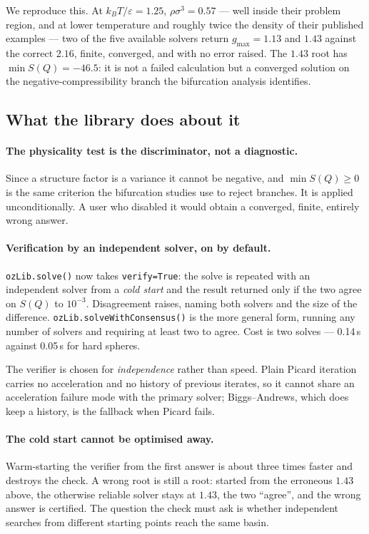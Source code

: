 \documentclass[11pt,a4paper]{article}
\newcommand{\code}[1]{\texttt{\hspace{0pt}#1}}
\begin{document}
We reproduce this. At $k_BT/\varepsilon = 1.25$, $\rho\sigma^3 = 0.57$ ---
well inside their problem region, and at lower temperature and roughly twice
the density of their published examples --- two of the five available solvers
return $g_{\max} = 1.13$ and $1.43$ against the correct $2.16$, finite,
converged, and with no error raised. The $1.43$ root has
$\min S(Q) = -46.5$: it is not a failed calculation but a converged solution
on the negative-compressibility branch the bifurcation analysis identifies.

\subsection{What the library does about it}

\paragraph{The physicality test is the discriminator, not a diagnostic.}
Since a structure factor is a variance it cannot be negative, and
$\min S(Q) \ge 0$ is the same criterion the bifurcation studies use to reject
branches. It is applied unconditionally. A user who disabled it would obtain
a converged, finite, entirely wrong answer.

\paragraph{Verification by an independent solver, on by default.}
\code{ozLib.solve()} now takes \code{verify=True}: the solve is repeated with
an independent solver from a \emph{cold start} and the result returned only if
the two agree on $S(Q)$ to $10^{-3}$. Disagreement raises, naming both solvers
and the size of the difference. \code{ozLib.solveWithConsensus()} is the more
general form, running any number of solvers and requiring at least two to
agree. Cost is two solves --- 0.14\,s against 0.05\,s for hard spheres.

The verifier is chosen for \emph{independence} rather than speed. Plain
Picard iteration carries no acceleration and no history of previous iterates,
so it cannot share an acceleration failure mode with the primary solver;
Biggs--Andrews, which does keep a history, is the fallback when Picard fails.

\paragraph{The cold start cannot be optimised away.} Warm-starting the
verifier from the first answer is about three times faster and destroys the
check. A wrong root is still a root: started from the erroneous $1.43$ above,
the otherwise reliable solver stays at $1.43$, the two ``agree'', and the
wrong answer is certified. The question the check must ask is whether
independent searches from different starting points reach the same basin.
\end{document}
